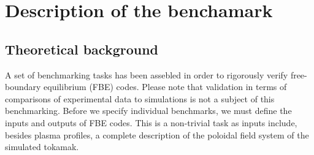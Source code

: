 
\section{Description of the benchamark} %
\label{sec:description}

\subsection{Theoretical background} %
\label{ssub:theoretical_background}

A set of benchmarking tasks has been assebled in order to rigorously verify free-boundary equilibrium (FBE) codes. Please note that validation in terms of comparisons of experimental data to simulations is not a subject of this benchmarking. Before we specify individual benchmarks, we must define the inputs and outputs of FBE codes. This is a non-trivial task as inputs include, besides plasma profiles, a complete description of the poloidal field system of the simulated tokamak. 

